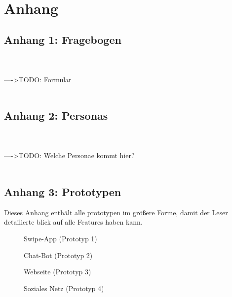 
\chapter{Anhang}
\label{chap:appendix}

\section{Anhang 1: Fragebogen}
\label{anhang:fragebogen}
\\\\---->TODO: Formular\\\\

\section{Anhang 2: Personas}
\label{anhang:personas}
\\\\---->TODO: Welche Personae kommt hier?\\\\

\section{Anhang 3: Prototypen}
\label{anhang:protos}
Dieses Anhang enthält alle prototypen im größere Forme, damit der Leser detailierte blick auf alle Features haben kann.

\begin{figure}[ht]
    \centering
    \caption{Swipe-App (Prototyp 1)}
    \label{fig:prt1}
\end{figure}

\begin{figure}[ht]
    \centering
    \caption{Chat-Bot (Prototyp 2)}
    \label{fig:prt2}
\end{figure}

\begin{figure}[ht]
    \centering
    \caption{Webseite (Prototyp 3)}
    \label{fig:prt3}
\end{figure}

\begin{figure}[ht]
    \centering
    \caption{Soziales Netz (Prototyp 4)}
    \label{fig:prt4}
\end{figure}

